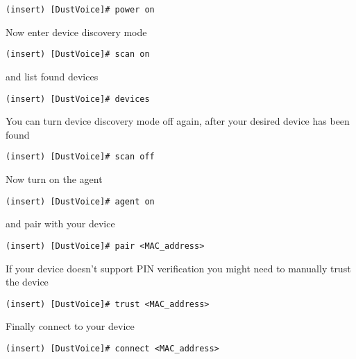 \documentclass[10pt]{dustdoc}
\begin{document}
\begin{verbatim}
(insert) [DustVoice]# power on
\end{verbatim}

Now enter device discovery mode

\begin{verbatim}
(insert) [DustVoice]# scan on
\end{verbatim}

\noindent
and list found devices

\begin{verbatim}
(insert) [DustVoice]# devices
\end{verbatim}

\begin{NOTE}
    You can turn device discovery mode off again, after your desired device has been found

    \begin{verbatim}
(insert) [DustVoice]# scan off
    \end{verbatim}
\end{NOTE}

Now turn on the agent

\begin{verbatim}
(insert) [DustVoice]# agent on
\end{verbatim}

\noindent
and pair with your device

\begin{verbatim}
(insert) [DustVoice]# pair <MAC_address>
\end{verbatim}

\begin{NOTE}
    If your device doesn’t support PIN verification you might need to manually trust the device

    \begin{verbatim}
(insert) [DustVoice]# trust <MAC_address>
    \end{verbatim}
\end{NOTE}

Finally connect to your device

\begin{verbatim}
(insert) [DustVoice]# connect <MAC_address>
\end{verbatim}
\end{document}
